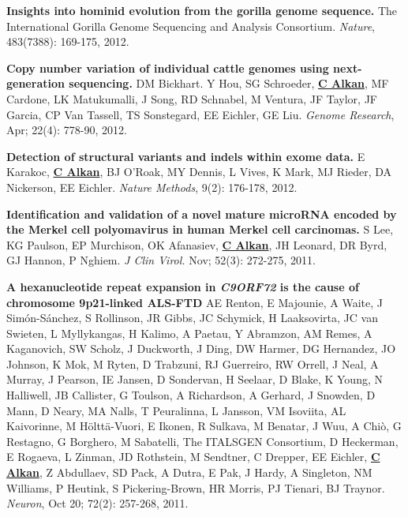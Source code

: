 \vspace{-.2cm}
{\bf Insights into hominid evolution from the gorilla genome sequence.}
The International Gorilla Genome Sequencing and Analysis Consortium.
{\em Nature}, 483(7388): 169-175, 2012. 

\vspace{-.2cm}
{\bf Copy number variation of individual cattle genomes using next-generation sequencing.} 
DM Bickhart. Y Hou, SG Schroeder, {\bf {\underline {C Alkan}}}, MF Cardone, LK Matukumalli, J Song, 
RD Schnabel, M Ventura, JF Taylor, JF Garcia, CP Van Tassell, TS Sonstegard, EE Eichler, GE Liu. 
{\em Genome Research}, Apr; 22(4): 778-90, 2012.

\vspace{-.2cm}
{\bf Detection of structural variants and indels within exome data.} E Karakoc, {\bf {\underline {C Alkan}}}, BJ O'Roak, 
MY Dennis, L Vives, K Mark, MJ Rieder, DA Nickerson, EE Eichler. {\em Nature Methods}, 9(2): 176-178, 2012.

\clearpage
\vspace{-.2cm}
{\bf Identification and validation of a novel mature microRNA encoded by the Merkel cell polyomavirus in human Merkel cell carcinomas.}
S Lee, KG Paulson, EP Murchison, OK Afanasiev, {\bf {\underline {C Alkan}}}, JH Leonard, DR Byrd, GJ Hannon, 
P Nghiem. {\em J Clin Virol.} Nov; 52(3): 272-275, 2011. 



\vspace{-.2cm}
{\bf A hexanucleotide repeat expansion in \textit{C9ORF72} is the cause of chromosome 9p21-linked ALS-FTD}  
AE Renton, E Majounie, A Waite, J Simón-Sánchez, S Rollinson, JR Gibbs, JC Schymick, H Laaksovirta, JC van Swieten, L Myllykangas, 
H Kalimo, A Paetau, Y Abramzon, AM Remes, A Kaganovich, SW Scholz, J Duckworth, J Ding, DW Harmer, DG Hernandez, JO Johnson, 
K Mok, M Ryten, D Trabzuni, RJ Guerreiro, RW Orrell, J Neal, A Murray, J Pearson, IE Jansen, D Sondervan, H Seelaar, D Blake, 
K Young, N Halliwell, JB Callister, G Toulson, A Richardson, A Gerhard, J Snowden, D Mann, D Neary, MA Nalls, T Peuralinna, 
L Jansson, VM Isoviita, AL Kaivorinne, M Hölttä-Vuori, E Ikonen, R Sulkava, M Benatar, J Wuu, A Chiò, G Restagno, 
G Borghero, M Sabatelli, The ITALSGEN Consortium, D Heckerman, E Rogaeva, L Zinman, JD Rothstein, M Sendtner, C Drepper, EE Eichler, 
{\bf {\underline {C Alkan}}}, Z Abdullaev, SD Pack, A Dutra, E Pak, J Hardy, A Singleton, NM Williams, P Heutink, S Pickering-Brown, 
HR Morris, PJ Tienari, BJ Traynor. {\em Neuron}, Oct 20; 72(2): 257-268, 2011.

